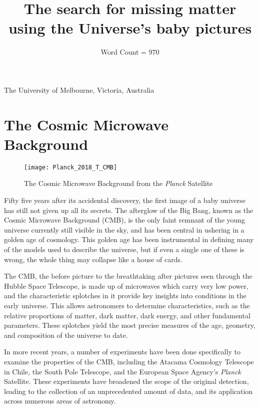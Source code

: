 \documentclass{nature}
\title{The search for missing matter using the Universe's baby pictures}
\author{Word Count = 970}
\begin{document}
\maketitle

\begin{affiliations}
 \item The University of Melbourne, Victoria, Australia
\end{affiliations}


\section{The Cosmic Microwave Background}
\begin{figure}
    \label{fig:planck}
    \begin{center}
        \texttt{[image: Planck\_2018\_T\_CMB]}
        \caption{The Cosmic Microwave Background from the \textit{Planck} Satellite}
    \end{center}
\end{figure}
Fifty five years after its accidental discovery, the first image of a baby universe has still not given up all its secrets. The afterglow of the Big Bang, known as the Cosmic Microwave Background (CMB), is the only faint remnant of the young universe currently still visible in the sky, and has been central in ushering in a golden age of cosmology. This golden age has been instrumental in defining many of the models used to describe the universe, but if even a single one of these is wrong, the whole thing may collapse like a house of cards. 

The CMB, the before picture to the breathtaking after pictures seen through the Hubble Space Telescope, is made up of microwaves which carry very low power, and the characteristic splotches in it provide key insights into conditions in the early universe. This allows astronomers to determine characteristics, such as the relative proportions of matter, dark matter, dark energy, and other fundamental parameters. These splotches yield the most precise measures of the age, geometry, and composition of the universe to date. 

In more recent years, a number of experiments have been done specifically to examine the properties of the CMB, including the Atacama Cosmology Telescope in Chile, the South Pole Telescope, and the European Space Agency's \textit{Planck} Satellite. These experiments have broadened the scope of the original detection, leading to the collection of an unprecedented amount of data, and its application across numerous areas of astronomy. 
\end{document}

